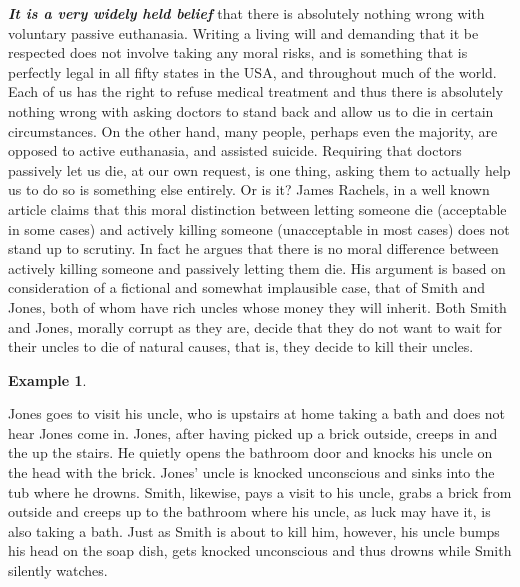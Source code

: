 \documentclass[
  12pt, openany]{book}
\theoremstyle{definition}
\theoremstyle{definition}
\newtheorem{example}{Example}[chapter]
\theoremstyle{definition}
\theoremstyle{definition}
\theoremstyle{remark}
\begin{document}
\textbf{\emph{It is a very widely held belief}} that there is absolutely nothing wrong with voluntary passive euthanasia. Writing a living will and demanding that it be respected does not involve taking any moral risks, and is something that is perfectly legal in all fifty states in the USA, and throughout much of the world. Each of us has the right to refuse medical treatment and thus there is absolutely nothing wrong with asking doctors to stand back and allow us to die in certain circumstances. On the other hand, many people, perhaps even the majority, are opposed to active euthanasia, and assisted suicide. Requiring that doctors passively let us die, at our own request, is one thing, asking them to actually help us to do so is something else entirely. Or is it? James Rachels, in a well known article claims that this moral distinction between letting someone die (acceptable in some cases) and actively killing someone (unacceptable in most cases) does not stand up to scrutiny. In fact he argues that there is no moral difference between actively killing someone and passively letting them die. His argument is based on consideration of a fictional and somewhat implausible case, that of Smith and Jones, both of whom have rich uncles whose money they will inherit. Both Smith and Jones, morally corrupt as they are, decide that they do not want to wait for their uncles to die of natural causes, that is, they decide to kill their uncles.

\begin{center}

\begin{example}
\protect\hypertarget{exm:unlabeled-div-1}{}\label{exm:unlabeled-div-1}

Jones goes to visit his uncle, who is upstairs at home taking a bath and does not hear Jones come in. Jones, after having picked up a brick outside, creeps in and the up the stairs. He quietly opens the bathroom door and knocks his uncle on the head with the brick. Jones' uncle is knocked unconscious and sinks into the tub where he drowns. Smith, likewise, pays a visit to his uncle, grabs a brick from outside and creeps up to the bathroom where his uncle, as luck may have it, is also taking a bath. Just as Smith is about to kill him, however, his uncle bumps his head on the soap dish, gets knocked unconscious and thus drowns while Smith silently watches.

\end{example}


\end{center}
\end{document}
